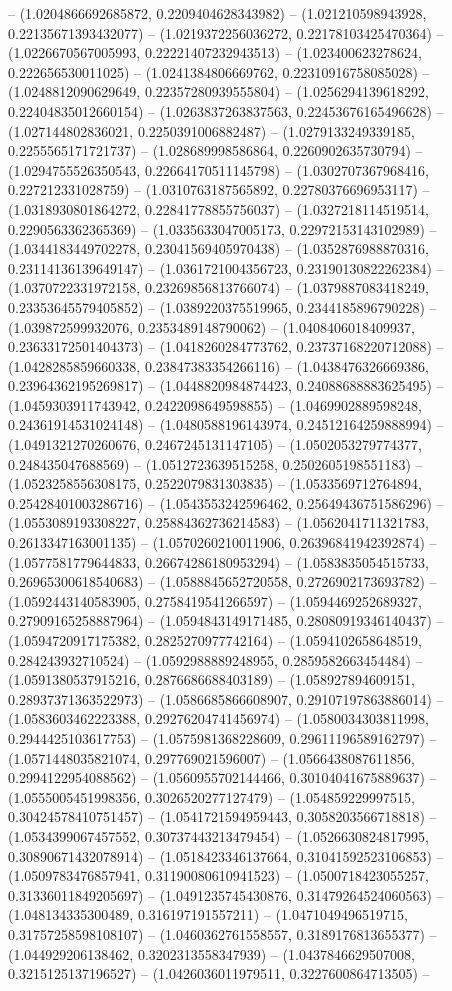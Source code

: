 -- (1.0204866692685872, 0.2209404628343982) -- (1.021210598943928, 0.22135671393432077) -- (1.0219372256036272, 0.22178103425470364) -- (1.0226670567005993, 0.22221407232943513) -- (1.023400623278624, 0.222656530011025) -- (1.0241384806669762, 0.22310916758085028) -- (1.0248812090629649, 0.22357280939555804) -- (1.0256294139618292, 0.22404835012660154) -- (1.0263837263837563, 0.22453676165496628) -- (1.027144802836021, 0.2250391006882487) -- (1.0279133249339185, 0.2255565171721737) -- (1.028689998586864, 0.2260902635730794) -- (1.0294755526350543, 0.22664170511145798) -- (1.0302707367968416, 0.227212331028759) -- (1.0310763187565892, 0.22780376696953117) -- (1.0318930801864272, 0.22841778855756037) -- (1.0327218114519514, 0.2290563362365369) -- (1.0335633047005173, 0.22972153143102989) -- (1.0344183449702278, 0.23041569405970438) -- (1.0352876988870316, 0.23114136139649147) -- (1.0361721004356723, 0.23190130822262384) -- (1.0370722331972158, 0.23269856813766074) -- (1.0379887083418249, 0.23353645579405852) -- (1.0389220375519965, 0.2344185896790228) -- (1.039872599932076, 0.2353489148790062) -- (1.0408406018409937, 0.23633172501404373) -- (1.0418260284773762, 0.23737168220712088) -- (1.0428285859660338, 0.23847383354266116) -- (1.0438476326669386, 0.23964362195269817) -- (1.0448820984874423, 0.24088688883625495) -- (1.0459303911743942, 0.2422098649598855) -- (1.0469902889598248, 0.24361914531024148) -- (1.0480588196143974, 0.24512164259888994) -- (1.0491321270260676, 0.2467245131147105) -- (1.0502053279774377, 0.248435047688569) -- (1.0512723639515258, 0.2502605198551183) -- (1.0523258556308175, 0.2522079831303835) -- (1.0533569712764894, 0.25428401003286716) -- (1.0543553242596462, 0.25649436751586296) -- (1.0553089193308227, 0.25884362736214583) -- (1.0562041711321783, 0.2613347163001135) -- (1.0570260210011906, 0.26396841942392874) -- (1.0577581779644833, 0.26674286180953294) -- (1.0583835054515733, 0.26965300618540683) -- (1.0588845652720558, 0.2726902173693782) -- (1.0592443140583905, 0.2758419541266597) -- (1.0594469252689327, 0.27909165258887964) -- (1.0594843149171485, 0.28080919346140437) -- (1.0594720917175382, 0.2825270977742164) -- (1.0594102658648519, 0.284243932710524) -- (1.0592988889248955, 0.2859582663454484) -- (1.0591380537915216, 0.2876686688403189) -- (1.058927894609151, 0.28937371363522973) -- (1.0586685866608907, 0.29107197863886014) -- (1.0583603462223388, 0.29276204741456974) -- (1.0580034303811998, 0.2944425103617753) -- (1.0575981368228609, 0.29611196589162797) -- (1.0571448035821074, 0.297769021596007) -- (1.0566438087611856, 0.2994122954088562) -- (1.0560955702144466, 0.30104041675889637) -- (1.0555005451998356, 0.3026520277127479) -- (1.054859229997515, 0.30424578410751457) -- (1.0541721594959443, 0.3058203566718818) -- (1.0534399067457552, 0.30737443213479454) -- (1.0526630824817995, 0.30890671432078914) -- (1.0518423346137664, 0.31041592523106853) -- (1.0509783476857941, 0.31190080610941523) -- (1.0500718423055257, 0.31336011849205697) -- (1.0491235745430876, 0.31479264524060563) -- (1.048134335300489, 0.316197191557211) -- (1.0471049496519715, 0.31757258598108107) -- (1.0460362761558557, 0.3189176813655377) -- (1.044929206138462, 0.3202313558347939) -- (1.0437846629507008, 0.3215125137196527) -- (1.0426036011979511, 0.3227600864713505) -- 